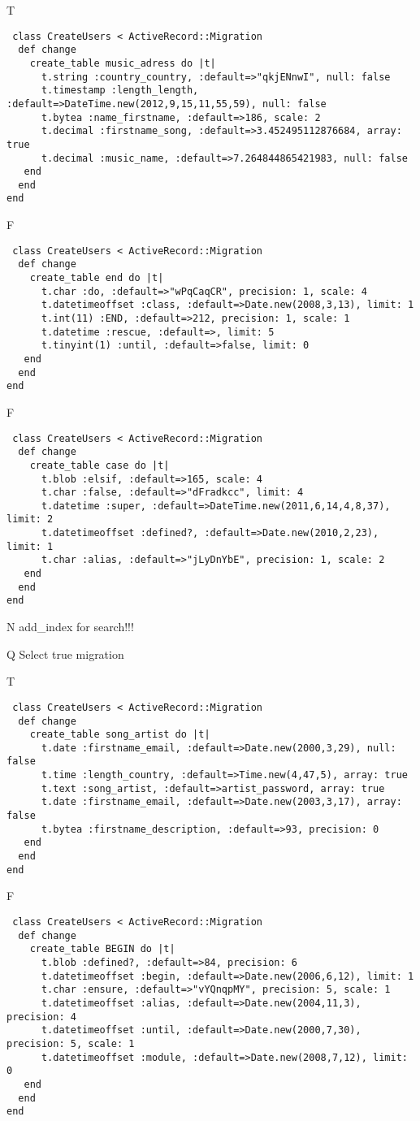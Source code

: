 T
\begin{verbatim}
 class CreateUsers < ActiveRecord::Migration 
  def change 
    create_table music_adress do |t| 
      t.string :country_country, :default=>"qkjENnwI", null: false
      t.timestamp :length_length, :default=>DateTime.new(2012,9,15,11,55,59), null: false
      t.bytea :name_firstname, :default=>186, scale: 2
      t.decimal :firstname_song, :default=>3.452495112876684, array: true
      t.decimal :music_name, :default=>7.264844865421983, null: false
   end 
  end 
end
\end{verbatim}

F
\begin{verbatim}
 class CreateUsers < ActiveRecord::Migration 
  def change 
    create_table end do |t| 
      t.char :do, :default=>"wPqCaqCR", precision: 1, scale: 4
      t.datetimeoffset :class, :default=>Date.new(2008,3,13), limit: 1
      t.int(11) :END, :default=>212, precision: 1, scale: 1
      t.datetime :rescue, :default=>, limit: 5
      t.tinyint(1) :until, :default=>false, limit: 0
   end 
  end 
end
\end{verbatim}

F
\begin{verbatim}
 class CreateUsers < ActiveRecord::Migration 
  def change 
    create_table case do |t| 
      t.blob :elsif, :default=>165, scale: 4
      t.char :false, :default=>"dFradkcc", limit: 4
      t.datetime :super, :default=>DateTime.new(2011,6,14,4,8,37), limit: 2
      t.datetimeoffset :defined?, :default=>Date.new(2010,2,23), limit: 1
      t.char :alias, :default=>"jLyDnYbE", precision: 1, scale: 2
   end 
  end 
end
\end{verbatim}
N
add_index for search!!!
  
Q
Select true migration

T
\begin{verbatim}
 class CreateUsers < ActiveRecord::Migration 
  def change 
    create_table song_artist do |t| 
      t.date :firstname_email, :default=>Date.new(2000,3,29), null: false
      t.time :length_country, :default=>Time.new(4,47,5), array: true
      t.text :song_artist, :default=>artist_password, array: true
      t.date :firstname_email, :default=>Date.new(2003,3,17), array: false
      t.bytea :firstname_description, :default=>93, precision: 0
   end 
  end 
end
\end{verbatim}

F
\begin{verbatim}
 class CreateUsers < ActiveRecord::Migration 
  def change 
    create_table BEGIN do |t| 
      t.blob :defined?, :default=>84, precision: 6
      t.datetimeoffset :begin, :default=>Date.new(2006,6,12), limit: 1
      t.char :ensure, :default=>"vYQnqpMY", precision: 5, scale: 1
      t.datetimeoffset :alias, :default=>Date.new(2004,11,3), precision: 4
      t.datetimeoffset :until, :default=>Date.new(2000,7,30), precision: 5, scale: 1
      t.datetimeoffset :module, :default=>Date.new(2008,7,12), limit: 0
   end 
  end 
end
\end{verbatim}

